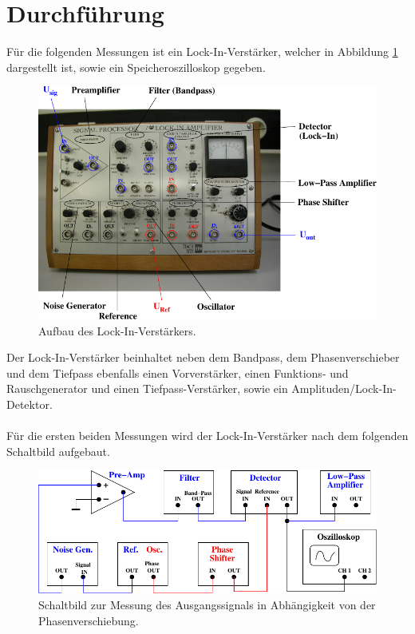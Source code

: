 \section{Durchführung}

    Für die folgenden Messungen ist ein Lock-In-Verstärker,
    welcher in Abbildung \ref{fig:verstärker} dargestellt ist,
    sowie ein Speicheroszilloskop gegeben.
    \begin{figure}[H]
        \centering
        \includegraphics[scale=1]{content/img/Abb_3.pdf}
        \caption{Aufbau des Lock-In-Verstärkers.}
        \label{fig:verstärker}
    \end{figure}
    Der Lock-In-Verstärker beinhaltet neben dem Bandpass,
    dem Phasenverschieber und dem Tiefpass ebenfalls einen Vorverstärker,
    einen Funktions- und Rauschgenerator und einen Tiefpass-Verstärker,
    sowie ein Amplituden/Lock-In-Detektor.\\
    \\
    Für die ersten beiden Messungen wird der Lock-In-Verstärker nach dem folgenden Schaltbild aufgebaut.
    \begin{figure}[H]
        \centering
        \includegraphics[scale=1]{content/img/Abb_4.pdf}
        \caption{Schaltbild zur Messung des Ausgangssignals in Abhängigkeit von der Phasenverschiebung.}
        \label{fig:schaltung1}
    \end{figure}
